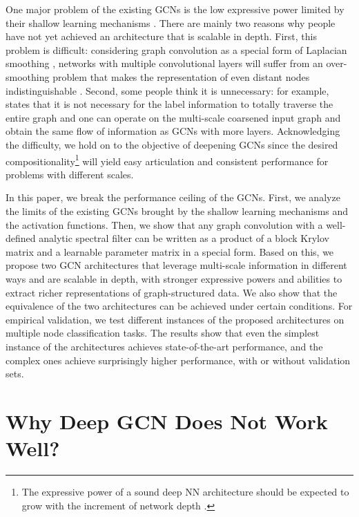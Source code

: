 \documentclass{article}
\begin{document}
One major problem of the existing GCNs is the low expressive power limited by their shallow learning mechanisms \cite{zhang2018graph, wu2019survey}. There are mainly two reasons why people have not yet achieved an architecture that is scalable in depth. First, this problem is difficult: considering graph convolution as a special form of Laplacian smoothing \cite{li2018deeper}, networks with multiple convolutional layers will suffer from an over-smoothing problem that makes the representation of even distant nodes indistinguishable \cite{zhang2018graph}. Second, some people think it is unnecessary: for example, \cite{bronstein2016geometric} states that it is not necessary for the label information to totally traverse the entire graph and one can operate on the multi-scale coarsened input graph and obtain the same flow of information as GCNs with more layers. Acknowledging the difficulty, we hold on to the objective of deepening GCNs since the desired compositionality\footnote{The expressive power of a sound deep NN architecture should be expected to grow with the increment of network depth \cite{lecun2015deep, hinton2006fast}.} will yield easy articulation and consistent performance for problems with different scales.

In this paper, we break the performance ceiling of the GCNs. First, we analyze the limits of the existing GCNs brought by the shallow learning mechanisms and the activation functions. Then, we show that any graph convolution with a well-defined analytic spectral filter can be written as a product of a block Krylov matrix and a learnable parameter matrix in a special form. Based on this, we propose two GCN architectures that leverage multi-scale information in different ways and are scalable in depth, with stronger expressive powers and abilities to extract richer representations of graph-structured data. We also show that the equivalence of the two architectures can be achieved under certain conditions. For empirical validation, we test different instances of the proposed architectures on multiple node classification tasks. The results show that even the simplest instance of the architectures achieves state-of-the-art performance, and the complex ones achieve surprisingly higher performance, with or without validation sets.

\section{Why Deep GCN Does Not Work Well?}\label{sec:why}
\end{document}
